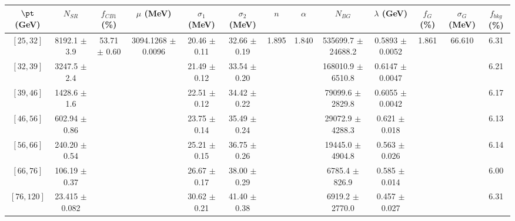 \begin{tabular}{c||c|c|c|c|c|c|c|c|c|c|c||c}
$\pt$ (GeV) & $N_{SR}$ & $f_{CB1}$ (\%) & $\mu$ (MeV) & $\sigma_1$ (MeV) & $\sigma_2$ (MeV) & $n$ & $\alpha$ & $N_{BG}$ & $\lambda$ (GeV) & $f_G$ (\%) & $\sigma_G$ (MeV) & $f_{bkg}$ (\%) \\
\hline
$[25, 32]$ & 8192.1 $\pm$ 3.9 & \multirow{7}{*}{53.71 $\pm$ 0.60} & \multirow{7}{*}{3094.1268 $\pm$ 0.0096} & 20.46 $\pm$ 0.11 & 32.66 $\pm$ 0.19 & \multirow{7}{*}{1.895} & \multirow{7}{*}{1.840} & 535699.7 $\pm$ 24688.2 & 0.5893 $\pm$ 0.0052 & \multirow{7}{*}{1.861} & \multirow{7}{*}{66.610} & 6.31\\
$[32, 39]$ & 3247.5 $\pm$ 2.4 &  &  & 21.49 $\pm$ 0.12 & 33.54 $\pm$ 0.20 &  &  & 168010.9 $\pm$ 6510.8 & 0.6147 $\pm$ 0.0047 &  &  & 6.21\\
$[39, 46]$ & 1428.6 $\pm$ 1.6 &  &  & 22.51 $\pm$ 0.12 & 34.42 $\pm$ 0.22 &  &  & 79099.6 $\pm$ 2829.8 & 0.6055 $\pm$ 0.0042 &  &  & 6.17\\
$[46, 56]$ & 602.94 $\pm$ 0.86 &  &  & 23.75 $\pm$ 0.14 & 35.49 $\pm$ 0.24 &  &  & 29072.9 $\pm$ 4288.3 & 0.621 $\pm$ 0.018 &  &  & 6.13\\
$[56, 66]$ & 240.20 $\pm$ 0.54 &  &  & 25.21 $\pm$ 0.15 & 36.75 $\pm$ 0.26 &  &  & 19445.0 $\pm$ 4904.8 & 0.563 $\pm$ 0.026 &  &  & 6.14\\
$[66, 76]$ & 106.19 $\pm$ 0.37 &  &  & 26.67 $\pm$ 0.17 & 38.00 $\pm$ 0.29 &  &  & 6785.4 $\pm$ 826.9 & 0.585 $\pm$ 0.014 &  &  & 6.00\\
$[76, 120]$ & 23.415 $\pm$ 0.082 &  &  & 30.62 $\pm$ 0.21 & 41.40 $\pm$ 0.38 &  &  & 6919.2 $\pm$ 2770.0 & 0.457 $\pm$ 0.027 &  &  & 6.31\\
\end{tabular}
